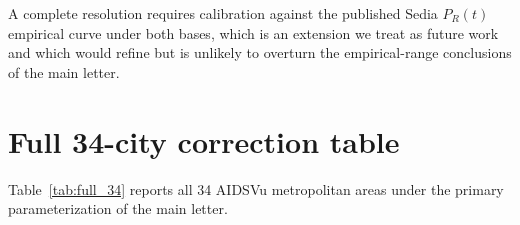 \documentclass[11pt]{article}
\begin{document}
A complete resolution requires calibration against the published Sedia $P_R(t)$ empirical curve under both bases, which is an extension we treat as future work and which would refine but is unlikely to overturn the empirical-range conclusions of the main letter.
\section{Full 34-city correction table}

Table~\ref{tab:full_34} reports all 34 AIDSVu metropolitan areas under the primary parameterization of the main letter.

\setlength{\LTleft}{0pt}
\setlength{\LTright}{0pt}
\setlength{\LTcapwidth}{\textwidth}
\setlength{\tabcolsep}{3pt}
\renewcommand{\arraystretch}{0.95}
\scriptsize
\end{document}
